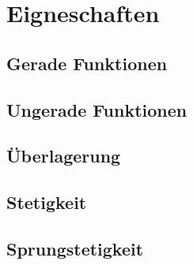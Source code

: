 \section{Eigneschaften}

\subsection{Gerade Funktionen}

\subsection{Ungerade Funktionen}

\subsection{Überlagerung}

\subsection{Stetigkeit}

\subsection{Sprungstetigkeit}

